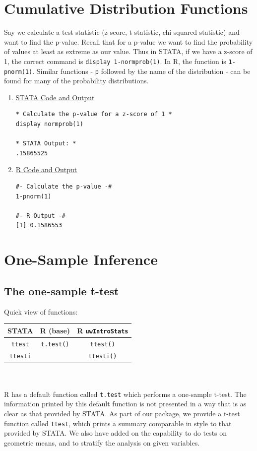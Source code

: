 \documentclass[11pt,letterpaper,fleqn]{report}
\begin{document}
\chapter{Cumulative Distribution Functions}
Say we calculate a test statistic (z-score, t-statistic, chi-squared statistic) and want to find the p-value. Recall that for a p-value we want to find the probability of values at least as extreme as our value. Thus in STATA, if we have a z-score of 1, the correct command is \texttt{display 1-normprob(1)}. In R, the function is \texttt{1-pnorm(1)}. Similar functions - \texttt{p} followed by the name of the distribution - can be found for many of the probability distributions.
\begin{enumerate}[]
\item \underline{STATA Code and Output}
{\scriptsize
\begin{verbatim}
* Calculate the p-value for a z-score of 1 *
display normprob(1)

* STATA Output: *
.15865525
\end{verbatim}}
\item \underline{R Code and Output}
{\scriptsize
\begin{verbatim}
#- Calculate the p-value -#
1-pnorm(1)

#- R Output -# 
[1] 0.1586553
\end{verbatim}}
\end{enumerate}


\chapter{One-Sample Inference}

\section{The one-sample t-test}
Quick view of functions:\\
\begin{tabular}{ccc}
STATA & R (base) & R \texttt{uwIntroStats}\\
\hline
\texttt{ttest} & \texttt{t.test()} & \texttt{ttest()}\\
\texttt{ttesti} &  & \texttt{ttesti()}
\end{tabular}\\
\\

R has a default function called \texttt{t.test} which performs a one-sample t-test. The information printed by this default function is not presented in a way that is as clear as that provided by STATA. As part of our package, we provide a t-test function called \texttt{ttest}, which prints a summary comparable in style to that provided by STATA. We also have added on the capability to do tests on geometric means, and to stratify the analysis on given variables.\\
\end{document}
